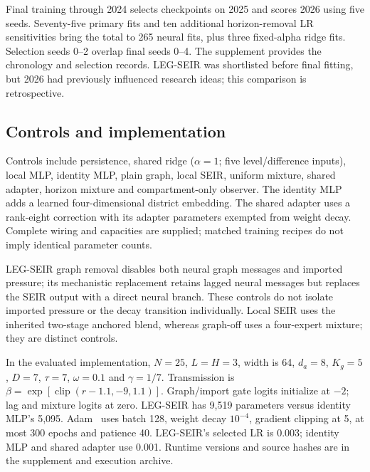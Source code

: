 \documentclass[conference]{IEEEtran}
\newcommand{\clip}{\operatorname{clip}}
\begin{document}
Final training through 2024 selects checkpoints on 2025 and scores 2026 using five seeds. Seventy-five primary fits and ten additional horizon-removal LR sensitivities bring the total to 265 neural fits, plus three fixed-alpha ridge fits. Selection seeds 0--2 overlap final seeds 0--4. The supplement provides the chronology and selection records. LEG-SEIR was shortlisted before final fitting, but 2026 had previously influenced research ideas; this comparison is retrospective.

\subsection{Controls and implementation}
Controls include persistence, shared ridge ($\alpha=1$; five level/difference inputs), local MLP, identity MLP, plain graph, local SEIR, uniform mixture, shared adapter, horizon mixture and compartment-only observer. The identity MLP adds a learned four-dimensional district embedding. The shared adapter uses a rank-eight correction with its adapter parameters exempted from weight decay. Complete wiring and capacities are supplied; matched training recipes do not imply identical parameter counts.

LEG-SEIR graph removal disables both neural graph messages and imported pressure; its mechanistic replacement retains lagged neural messages but replaces the SEIR output with a direct neural branch. These controls do not isolate imported pressure or the decay transition individually. Local SEIR uses the inherited two-stage anchored blend, whereas graph-off uses a four-expert mixture; they are distinct controls.

In the evaluated implementation, $N=25$, $L=H=3$, width is 64, $d_a=8$, $K_g=5$, $D=7$, $\tau=7$, $\omega=0.1$ and $\gamma=1/7$. Transmission is $\beta=\exp[\clip(r-1.1,-9,1.1)]$. Graph/import gate logits initialize at $-2$; lag and mixture logits at zero. LEG-SEIR has 9,519 parameters versus identity MLP's 5,095. Adam~\cite{kingma2015adam} uses batch 128, weight decay $10^{-4}$, gradient clipping at 5, at most 300 epochs and patience 40. LEG-SEIR's selected LR is 0.003; identity MLP and shared adapter use 0.001. Runtime versions and source hashes are in the supplement and execution archive.
\end{document}

